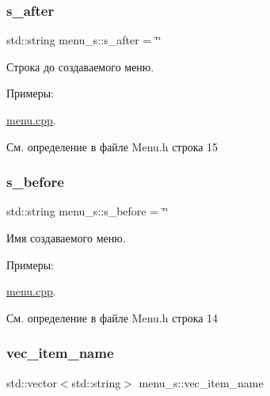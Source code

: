 \mbox{\label{structmenu__s_a8622e3ccae9b1356ad3e2e3eb51a44e8}} 
\subsubsection{\texorpdfstring{s\+\_\+after}{s\_after}}
{\footnotesize\ttfamily std\+::string menu\+\_\+s\+::s\+\_\+after = \char`\"{}\char`\"{}}

Строка до создаваемого меню. \begin{Desc}
\item[Примеры\+: ]\par
\hyperlink{menu_8cpp-example}{menu.\+cpp}.\end{Desc}


См. определение в файле Menu.\+h строка 15

\mbox{\label{structmenu__s_ad653d55a31d8503ad989ffd0b94c14e4}} 
\subsubsection{\texorpdfstring{s\+\_\+before}{s\_before}}
{\footnotesize\ttfamily std\+::string menu\+\_\+s\+::s\+\_\+before = \char`\"{}\char`\"{}}

Имя создаваемого меню. \begin{Desc}
\item[Примеры\+: ]\par
\hyperlink{menu_8cpp-example}{menu.\+cpp}.\end{Desc}


См. определение в файле Menu.\+h строка 14

\mbox{\label{structmenu__s_abf8d2985fb3bf50d8e2075701149375a}} 
\subsubsection{\texorpdfstring{vec\+\_\+item\+\_\+name}{vec\_item\_name}}
{\footnotesize\ttfamily std\+::vector$<$std\+::string$>$ menu\+\_\+s\+::vec\+\_\+item\+\_\+name}




